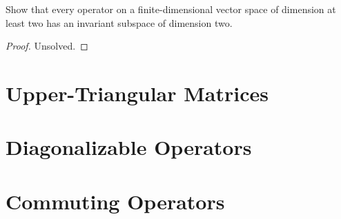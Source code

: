 \begin{exercise}
    Show that every operator on a finite-dimensional vector space of dimension at least two has an invariant subspace of dimension two.
\end{exercise}

\begin{proof}
    Unsolved.
\end{proof}
\newpage

\section{Upper-Triangular Matrices}

\section{Diagonalizable Operators}

\section{Commuting Operators}

